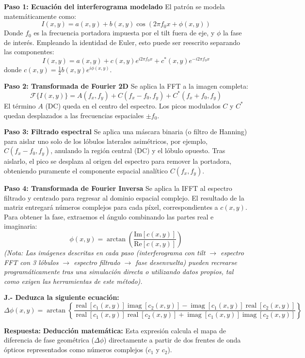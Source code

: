 \documentclass[12pt,letterpaper]{article}
\begin{document}
	\textbf{Paso 1: Ecuación del interferograma modelado}
	El patrón se modela matemáticamente como:
	\[
	I(x,y) = a(x,y) + b(x,y)\cos(2\pi f_0 x + \phi(x,y))
	\]
	Donde $f_0$ es la frecuencia portadora impuesta por el tilt fuera de eje, y $\phi$ la fase de interés. Empleando la identidad de Euler, esto puede ser reescrito separando las componentes:
	\[
	I(x,y) = a(x,y) + c(x,y)e^{i2\pi f_0 x} + c^*(x,y)e^{-i2\pi f_0 x}
	\]
	donde $c(x,y) = \frac{1}{2}b(x,y)e^{i\phi(x,y)}$.
	
	\textbf{Paso 2: Transformada de Fourier 2D}
	Se aplica la FFT a la imagen completa:
	\[
	\mathcal{F}\{I(x,y)\} = A(f_x, f_y) + C(f_x - f_0, f_y) + C^*(f_x + f_0, f_y)
	\]
	El término $A$ (DC) queda en el centro del espectro. Los picos modulados $C$ y $C^*$ quedan desplazados a las frecuencias espaciales $\pm f_0$.
	
	\textbf{Paso 3: Filtrado espectral}
	Se aplica una máscara binaria (o filtro de Hanning) para aislar uno solo de los lóbulos laterales asimétricos, por ejemplo, $C(f_x - f_0, f_y)$, anulando la región central (DC) y el lóbulo opuesto. Tras aislarlo, el pico se desplaza al origen del espectro para remover la portadora, obteniendo puramente el componente espacial analítico $C(f_x, f_y)$.
	
	\textbf{Paso 4: Transformada de Fourier Inversa}
	Se aplica la IFFT al espectro filtrado y centrado para regresar al dominio espacial complejo. El resultado de la matriz entregará números complejos para cada píxel, correspondientes a $c(x,y)$.
	Para obtener la fase, extraemos el ángulo combinando las partes real e imaginaria:
	\[
	\phi(x,y) = \arctan\left(\frac{\text{Im}[c(x,y)]}{\text{Re}[c(x,y)]}\right)
	\]
	\textit{(Nota: Las imágenes descritas en cada paso (interferograma con tilt $\rightarrow$ espectro FFT con 3 lóbulos $\rightarrow$ espectro filtrado $\rightarrow$ fase desenvuelta) pueden recrearse programáticamente tras una simulación directa o utilizando datos propios, tal como exigen las herramientas de este método).}
	
	\vspace{0.8cm}
	\noindent \textbf{J.- Deduzca la siguiente ecuación:
		\[
		\Delta\phi(x,y) = \arctan\left\{ \frac{\operatorname{real}[c_1(x,y)]\operatorname{imag}[c_2(x,y)] - \operatorname{imag}[c_1(x,y)]\operatorname{real}[c_2(x,y)]}{\operatorname{real}[c_1(x,y)]\operatorname{real}[c_2(x,y)] + \operatorname{imag}[c_1(x,y)]\operatorname{imag}[c_2(x,y)]} \right\}
		\]}
	
	\textbf{Respuesta:}
	\textbf{Deducción matemática:}
	Esta expresión calcula el mapa de diferencia de fase geométrica ($\Delta\phi$) directamente a partir de dos frentes de onda ópticos representados como números complejos ($c_1$ y $c_2$).
	
\end{document}
